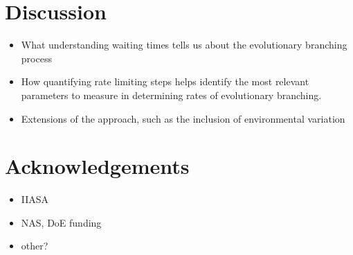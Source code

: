 \documentclass[authoryear,1p,10pt]{elsarticle}
\begin{document}
\section{Discussion}
\begin{itemize}
\item What understanding waiting times tells us about the evolutionary branching process
\item How quantifying rate limiting steps helps identify the most relevant parameters to measure in determining rates of evolutionary branching.  
\item Extensions of the approach, such as the inclusion of environmental variation
\end{itemize}

\section{Acknowledgements}
\begin{itemize}
\item IIASA
\item NAS, DoE funding
\item other?
\end{itemize}

\end{document}
